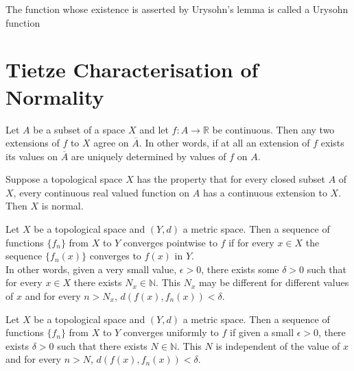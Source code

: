 \begin{remark}
	The function whose existence is asserted by Urysohn's lemma is called a Urysohn function
\end{remark}

\section{Tietze Characterisation of Normality}
\begin{proposition}
	Let \( A \) be a subset of a space \( X \) and let \( f : A \to \mathbb{R} \) be continuous. Then any two extensions of \( f \) to \( X \) agree on \( \overline{A} \). In other words, if at all an extension of \( f \) exists its values on \( \overline{A} \) are uniquely determined by values of \( f \) on \( A \).
\end{proposition}

\begin{proposition}
	Suppose a topological space \( X \) has the property that for every closed subset \( A \) of \( X \), every continuous real valued function on \( A \) has a continuous extension to \( X \). Then \( X \) is normal.
\end{proposition}

\begin{definition}
	Let \( X \) be a topological space and \( (Y,d) \) a metric space. Then a sequence of functions \( \{ f_n \} \) from \( X \) to \( Y \) converges pointwise to \( f \) if for every \( x \in X \) the sequence \( \{ f_n(x) \} \) converges to \( f(x) \) in \( Y \).\\
	
	In other words, given a very small value, \( \epsilon > 0 \), there exists some \( \delta > 0 \) such that for every \( x \in X \) there exists \( N_x \in \mathbb{N} \). This \( N_x \) may be different for different values of \( x \) and for every \( n > N_x \), \( d(f(x),f_n(x)) < \delta \).
\end{definition}

\begin{definition}
	Let \( X \) be a topological space and \( (Y,d) \) a metric space. Then a sequence of functions \( \{ f_n \} \) from \( X \) to \( Y \) converges uniformly to \( f \) if given a small \( \epsilon > 0 \), there exists \( \delta > 0 \) such that there exists \( N \in \mathbb{N} \). This $N$ is independent of the value of \( x \) and for every \( n > N \), \( d(f(x),f_n(x)) < \delta \).
\end{definition}

